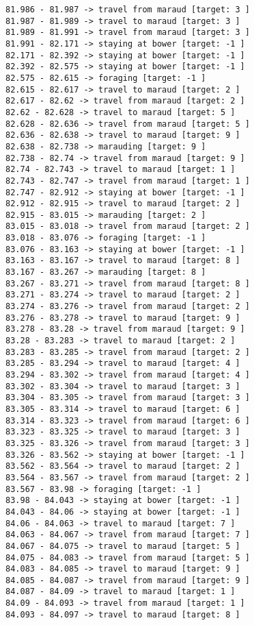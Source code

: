 \documentclass[11pt]{article}
\begin{document}
\begin{Verbatim}[commandchars=\\\{\}]
81.986 - 81.987 -> travel from maraud [target: 3 ]
81.987 - 81.989 -> travel to maraud [target: 3 ]
81.989 - 81.991 -> travel from maraud [target: 3 ]
81.991 - 82.171 -> staying at bower [target: -1 ]
82.171 - 82.392 -> staying at bower [target: -1 ]
82.392 - 82.575 -> staying at bower [target: -1 ]
82.575 - 82.615 -> foraging [target: -1 ]
82.615 - 82.617 -> travel to maraud [target: 2 ]
82.617 - 82.62 -> travel from maraud [target: 2 ]
82.62 - 82.628 -> travel to maraud [target: 5 ]
82.628 - 82.636 -> travel from maraud [target: 5 ]
82.636 - 82.638 -> travel to maraud [target: 9 ]
82.638 - 82.738 -> marauding [target: 9 ]
82.738 - 82.74 -> travel from maraud [target: 9 ]
82.74 - 82.743 -> travel to maraud [target: 1 ]
82.743 - 82.747 -> travel from maraud [target: 1 ]
82.747 - 82.912 -> staying at bower [target: -1 ]
82.912 - 82.915 -> travel to maraud [target: 2 ]
82.915 - 83.015 -> marauding [target: 2 ]
83.015 - 83.018 -> travel from maraud [target: 2 ]
83.018 - 83.076 -> foraging [target: -1 ]
83.076 - 83.163 -> staying at bower [target: -1 ]
83.163 - 83.167 -> travel to maraud [target: 8 ]
83.167 - 83.267 -> marauding [target: 8 ]
83.267 - 83.271 -> travel from maraud [target: 8 ]
83.271 - 83.274 -> travel to maraud [target: 2 ]
83.274 - 83.276 -> travel from maraud [target: 2 ]
83.276 - 83.278 -> travel to maraud [target: 9 ]
83.278 - 83.28 -> travel from maraud [target: 9 ]
83.28 - 83.283 -> travel to maraud [target: 2 ]
83.283 - 83.285 -> travel from maraud [target: 2 ]
83.285 - 83.294 -> travel to maraud [target: 4 ]
83.294 - 83.302 -> travel from maraud [target: 4 ]
83.302 - 83.304 -> travel to maraud [target: 3 ]
83.304 - 83.305 -> travel from maraud [target: 3 ]
83.305 - 83.314 -> travel to maraud [target: 6 ]
83.314 - 83.323 -> travel from maraud [target: 6 ]
83.323 - 83.325 -> travel to maraud [target: 3 ]
83.325 - 83.326 -> travel from maraud [target: 3 ]
83.326 - 83.562 -> staying at bower [target: -1 ]
83.562 - 83.564 -> travel to maraud [target: 2 ]
83.564 - 83.567 -> travel from maraud [target: 2 ]
83.567 - 83.98 -> foraging [target: -1 ]
83.98 - 84.043 -> staying at bower [target: -1 ]
84.043 - 84.06 -> staying at bower [target: -1 ]
84.06 - 84.063 -> travel to maraud [target: 7 ]
84.063 - 84.067 -> travel from maraud [target: 7 ]
84.067 - 84.075 -> travel to maraud [target: 5 ]
84.075 - 84.083 -> travel from maraud [target: 5 ]
84.083 - 84.085 -> travel to maraud [target: 9 ]
84.085 - 84.087 -> travel from maraud [target: 9 ]
84.087 - 84.09 -> travel to maraud [target: 1 ]
84.09 - 84.093 -> travel from maraud [target: 1 ]
84.093 - 84.097 -> travel to maraud [target: 8 ]

\end{Verbatim}
\end{document}

